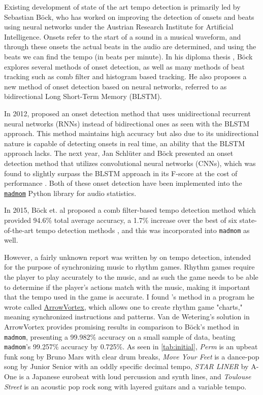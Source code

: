 \documentclass[11pt, oneside]{article}
\begin{document}
Existing development of state of the art tempo detection is primarily led by
Sebastian Böck, who has worked on improving the detection of onsets and beats
using neural networks under the Austrian Research Institute for Artificial
Intelligence. Onsets refer to the start of a sound in a musical waveform, and
through these onsets the actual beats in the audio are determined, and using the
beats we can find the tempo (in beats per minute). In his diploma thesis
\cite{bockthesis}, Böck explores several methods of onset detection, as well as
many methods of beat tracking such as comb filter and histogram based tracking.
He also proposes a new method of onset detection based on neural networks,
referred to as bidirectional Long Short-Term Memory (BLSTM).

In 2012, \citeauthor*{bockll} proposed an onset detection method that uses
unidirectional recurrent neural networks (RNNs) \cite{bockll} instead of
bidirectional ones as seen with the BLSTM approach. This method maintains high
accuracy but also due to its unidirectional nature is capable of detecting
onsets in real time, an ability that the BLSTM approach lacks. The next year,
Jan Schlüter and Böck presented an onset detection method that utilizes
convolutional neural networks (CNNs), which was found to slightly surpass the
BLSTM approach in its F-score at the cost of performance \cite{bockcnn}. Both of
these onset detection have been implemented into the
\href{https://github.com/CPJKU/madmom}{\texttt{madmom}} Python library for audio
statistics.

In 2015, Böck et. al proposed a comb filter-based tempo detection method which
provided 94.6\% total average accuracy, a 1.7\% increase over the best of six
state-of-the-art tempo detection methods \cite{bockcomb}, and this was
incorporated into \texttt{madmom} as well.

However, a fairly unknown report was written by \citeauthor*{bram} \cite{bram}
on tempo detection, intended for the purpose of synchronizing music to rhythm
games. Rhythm games require the player to play accurately to the music, and as
such the game needs to be able to determine if the player’s actions match with
the music, making it important that the tempo used in the game is accurate. I
found \citeauthor*{bram}’s method in a program he wrote called
\href{https://arrowvortex.ddrnl.com/index.html}{ArrowVortex}, which allows one
to create rhythm game "charts," meaning synchronized instructions and patterns.
Van de Wetering’s solution in ArrowVortex provides promising results in
comparison to Böck’s method in \texttt{madmom}, presenting a 99.982\% accuracy
on a small sample of data, beating \texttt{madmom}’s 99.257\% accuracy by
0.725\%. As seen in \autoref{tab:initial}, \textit{Perm} is an upbeat funk song
by Bruno Mars with clear drum breaks, \textit{Move Your Feet} is a dance-pop
song by Junior Senior with an oddly specific decimal tempo, \textit{STAR LINER}
by A-One is a Japanese eurobeat with loud percussion and synth lines, and
\textit{Toulouse Street} is an acoustic pop rock song with layered guitars and a
variable tempo.
\end{document}
